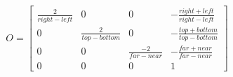 \documentclass{article}
\begin{document}
$$
  O =
\left[ \begin{array}{cccc}
    \frac{2}{right-left}    & 0 & 0 & - \frac{right+left}{right-left}\\
    0 & \frac{2}{top-bottom}    & 0 &  - \frac{top+bottom}{top-bottom}\\
    0 & 0 & \frac{-2}{far-near}     &  - \frac{far+near}{far-near}\\
    0 & 0 & 0 & 1
  \end{array} \right]
$$
\end{document}
